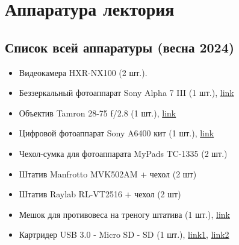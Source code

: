 \section{Аппаратура лектория}\label{sec:lectory-equipment}

\subsection{Список всей аппаратуры (весна 2024)}\label{ssec:list-lectory-equipment}


\begin{itemize}[noitemsep]
  \item Видеокамера \textsf{HXR-NX100} (2 шт.).
  \item Беззеркальный фотоаппарат \textsf{Sony Alpha 7 III} (1 шт.), \href{https://www.dns-shop.ru/product/072f7a181f95ed20/bezzerkalnyj-fotoapparat-sony-alpha-7-iii-ilce-7m3-body-cernyj/?utm_medium=organic&utm_source=google&utm_referrer=https%3A%2F%2Fwww.google.com%2F}{link}
  \item Объектив \textsf{Tamron 28-75 f/2.8} (1 шт.), \href{https://market.yandex.ru/product--28-75mm-f-2-8-di-iii-vxd-g2-a063-sony-fe/1815178142?sku=101932837729&uniqueId=949986&do-waremd5=FH5qCCaCayJf1G2uHYFeAg}{link}
  \item Цифровой фотоаппарат \textsf{Sony A6400 кит} (1 шт.), \href{https://market.yandex.ru/product--alpha-ilce-6400-kit/421247398?sku=100616674751&uniqueId=892410&sponsored=1}{link}
  \item Чехол-сумка для фотоаппарата \textsf{MyPads TC-1335} (2 шт.)
  \item Штатив \textsf{Manfrotto MVK502AM} + чехол (2 шт)
  \item Штатив \textsf{Raylab RL-VT2516} + чехол (2 шт)
  \item Мешок для противовеса на треногу штатива (1 шт.), \href{https://www.ozon.ru/product/meshok-dlya-protivovesa-na-trenogu-shtativa-769963740/?asb=8pf%252Fu%252BR9J%252F0MwpX%252FMdg6zKRAYGZWdDesBOSTgX%252B%252BySE%253D&asb2=w3nj9ameRlr2ICqO15NVC3I6JbtCf0cZsgbqbvSIzWnrqtTuW8KdLdOPydeCvUxYhyvdoT2nJcss7vqlk0vj1A&avtc=1&avte=2&avts=1724448913&keywords=%D0%9C%D0%B5%D1%88%D0%BE%D0%BA++%D0%BD%D0%B0+%D1%82%D1%80%D0%B5%D0%BD%D0%BE%D0%B3%D1%83+%D1%88%D1%82%D0%B0%D1%82%D0%B8%D0%B2%D0%B0&tab=reviews}{link}
  \item Картридер USB 3.0 - Micro SD - SD (1 шт.), \href{https://www.ozon.ru/product/kartrider-usb-3-0-micro-sd-sd-perehodnik-dlya-fleshkart-2-v-1-1617100018/}{link1}, \href{https://www.ozon.ru/product/kartrider-usb3-0-sd-microsd-tf-sdhc-sdxc-chernyy-5bites-re3-200bk-806714264/}{link2}

\end{itemize}
